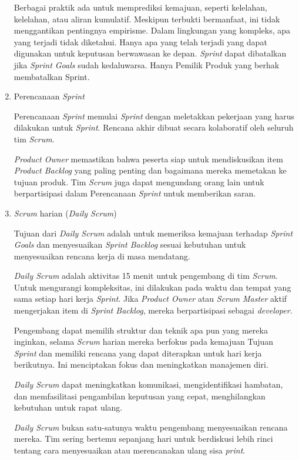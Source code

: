 \begin{enumerate}
	Berbagai praktik ada untuk memprediksi kemajuan, seperti kelelahan, kelelahan, atau aliran kumulatif. Meskipun terbukti bermanfaat, ini tidak menggantikan pentingnya empirisme. Dalam lingkungan yang kompleks, apa yang terjadi tidak diketahui. Hanya apa yang telah terjadi yang dapat digunakan untuk keputusan berwawasan ke depan. \emph{Sprint} dapat dibatalkan jika \emph{Sprint Goals} sudah kedaluwarsa. Hanya Pemilik Produk yang berhak membatalkan Sprint.
		
		\item Perencanaan \emph{Sprint}
		
		Perencanaan \emph{Sprint} memulai \emph{Sprint} dengan meletakkan pekerjaan yang harus dilakukan untuk \emph{Sprint}. Rencana akhir dibuat secara kolaboratif oleh seluruh tim \emph{Scrum}.

		\emph{Product Owner} memastikan bahwa peserta siap untuk mendiskusikan item \emph{Product Backlog} yang paling penting dan bagaimana mereka memetakan ke tujuan produk. Tim \emph{Scrum} juga dapat mengundang orang lain untuk berpartisipasi dalam Perencanaan \emph{Sprint} untuk memberikan saran.
		
		\item \emph{Scrum} harian (\emph{Daily Scrum})
		
		Tujuan dari \emph{Daily Scrum} adalah untuk memeriksa kemajuan terhadap \emph{Sprint Goals} dan menyesuaikan \emph{Sprint Backlog} sesuai kebutuhan untuk menyesuaikan rencana kerja di masa mendatang.

		\emph{Daily Scrum} adalah aktivitas 15 menit untuk pengembang di tim \emph{Scrum}. Untuk mengurangi kompleksitas, ini dilakukan pada waktu dan tempat yang sama setiap hari kerja \emph{Sprint}. Jika \emph{Product Owner} atau \emph{Scrum Master} aktif mengerjakan item di \emph{Sprint Backlog}, mereka berpartisipasi sebagai \emph{developer}.

		Pengembang dapat memilih struktur dan teknik apa pun yang mereka inginkan, selama \emph{Scrum} harian mereka berfokus pada kemajuan Tujuan \emph{Sprint} dan memiliki rencana yang dapat diterapkan untuk hari kerja berikutnya. Ini menciptakan fokus dan meningkatkan manajemen diri.

		\emph{Daily Scrum} dapat meningkatkan komunikasi, mengidentifikasi hambatan, dan memfasilitasi pengambilan keputusan yang cepat, menghilangkan kebutuhan untuk rapat ulang.
		
		\emph{Daily Scrum} bukan satu-satunya waktu pengembang menyesuaikan rencana mereka. Tim sering bertemu sepanjang hari untuk berdiskusi lebih rinci tentang cara menyesuaikan atau merencanakan ulang sisa \emph{print}.
		

\end{enumerate}
